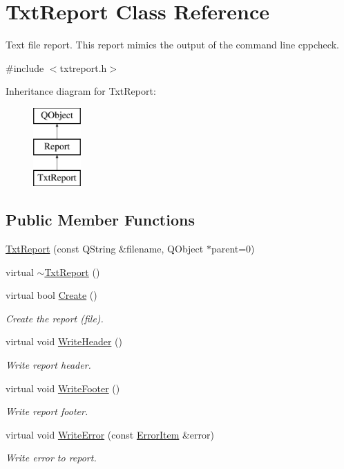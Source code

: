 \hypertarget{class_txt_report}{\section{Txt\-Report Class Reference}
\label{class_txt_report}
}


Text file report. This report mimics the output of the command line cppcheck.  




{\ttfamily \#include $<$txtreport.\-h$>$}

Inheritance diagram for Txt\-Report\-:\begin{figure}[H]
\begin{center}
\leavevmode
\includegraphics[height=3.000000cm]{class_txt_report}
\end{center}
\end{figure}
\subsection*{Public Member Functions}
\begin{DoxyCompactItemize}
\item 
\hyperlink{class_txt_report_a9d2afcd74f93b4c030b72098f2ecd45a}{Txt\-Report} (const Q\-String \&filename, Q\-Object $\ast$parent=0)
\item 
virtual \hyperlink{class_txt_report_a4b801a3f310cda8314be931acd592210}{$\sim$\-Txt\-Report} ()
\item 
virtual bool \hyperlink{class_txt_report_a99695ad4397a7a2b1cbf67a677ee3583}{Create} ()
\begin{DoxyCompactList}\small\item\em Create the report (file). \end{DoxyCompactList}\item 
virtual void \hyperlink{class_txt_report_ae64bf52ea272d87073fcf02da5c3aab4}{Write\-Header} ()
\begin{DoxyCompactList}\small\item\em Write report header. \end{DoxyCompactList}\item 
virtual void \hyperlink{class_txt_report_ad2e331c6425c23f8ee24b157fa3af99f}{Write\-Footer} ()
\begin{DoxyCompactList}\small\item\em Write report footer. \end{DoxyCompactList}\item 
virtual void \hyperlink{class_txt_report_a05e84af0cd5f284ce07001303a0a62b6}{Write\-Error} (const \hyperlink{class_error_item}{Error\-Item} \&error)
\begin{DoxyCompactList}\small\item\em Write error to report. \end{DoxyCompactList}\end{DoxyCompactItemize}
